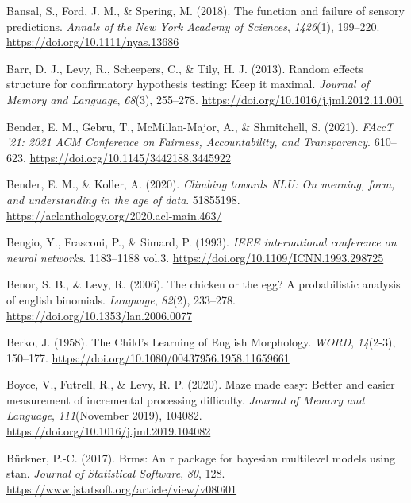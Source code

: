 \documentclass[
  12pt,
  letterpaper,
]{scrreprt}
\newlength{\cslhangindent}
\newenvironment{CSLReferences}[2] %
 {\begin{list}{}{%
  \setlength{\itemindent}{0pt}
  \setlength{\leftmargin}{0pt}
  \setlength{\parsep}{0pt}
  \ifodd #1
   \setlength{\leftmargin}{\cslhangindent}
   \setlength{\itemindent}{-1\cslhangindent}
  \fi
  \setlength{\itemsep}{#2\baselineskip}}}
 {\end{list}}
\begin{document}
\begin{CSLReferences}{1}{0}
Bansal, S., Ford, J. M., \& Spering, M. (2018). The function and failure
of sensory predictions. \emph{Annals of the New York Academy of
Sciences}, \emph{1426}(1), 199--220.
\url{https://doi.org/10.1111/nyas.13686}

Barr, D. J., Levy, R., Scheepers, C., \& Tily, H. J. (2013). Random
effects structure for confirmatory hypothesis testing: Keep it maximal.
\emph{Journal of Memory and Language}, \emph{68}(3), 255--278.
\url{https://doi.org/10.1016/j.jml.2012.11.001}

Bender, E. M., Gebru, T., McMillan-Major, A., \& Shmitchell, S. (2021).
\emph{FAccT '21: 2021 ACM Conference on Fairness, Accountability, and
Transparency}. 610--623. \url{https://doi.org/10.1145/3442188.3445922}

Bender, E. M., \& Koller, A. (2020). \emph{Climbing towards NLU: On
meaning, form, and understanding in the age of data}. 51855198.
\url{https://aclanthology.org/2020.acl-main.463/}

Bengio, Y., Frasconi, P., \& Simard, P. (1993). \emph{IEEE international
conference on neural networks}. 1183--1188 vol.3.
\url{https://doi.org/10.1109/ICNN.1993.298725}

Benor, S. B., \& Levy, R. (2006). The chicken or the egg? A
probabilistic analysis of english binomials. \emph{Language},
\emph{82}(2), 233--278. \url{https://doi.org/10.1353/lan.2006.0077}

Berko, J. (1958). The Child's Learning of English Morphology.
\emph{{\emph{WORD}}}, \emph{14}(2-3), 150--177.
\url{https://doi.org/10.1080/00437956.1958.11659661}

Boyce, V., Futrell, R., \& Levy, R. P. (2020). Maze made easy: Better
and easier measurement of incremental processing difficulty.
\emph{Journal of Memory and Language}, \emph{111}(November 2019),
104082. \url{https://doi.org/10.1016/j.jml.2019.104082}

Bürkner, P.-C. (2017). Brms: An r package for bayesian multilevel models
using stan. \emph{Journal of Statistical Software}, \emph{80}, 128.
\url{https://www.jstatsoft.org/article/view/v080i01}


\end{CSLReferences}
\end{document}
